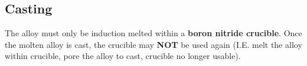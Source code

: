 \subsection{Casting}

The \MgZnCa alloy must only be induction melted within a \textbf{boron nitride crucible}. Once the molten alloy is cast, the crucible may \textbf{NOT} be used again (I.E. melt the alloy within crucible, pore the alloy to cast, crucible no longer usable). 